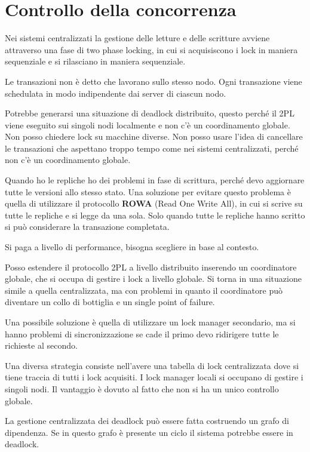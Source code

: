 \section{Controllo della concorrenza}
Nei sistemi centralizzati la gestione delle letture e delle scritture avviene
attraverso una fase di two phase locking, in cui si acquisiscono i lock in
maniera sequenziale e si rilasciano in maniera sequenziale.

Le transazioni non è detto che lavorano sullo stesso nodo. Ogni transazione 
viene schedulata in modo indipendente dai server di ciascun nodo.

Potrebbe generarsi una situazione di deadlock distribuito, questo perché il 2PL
viene eseguito sui singoli nodi localmente e non c'è un coordinamento globale.
Non posso chiedere lock su macchine diverse. Non posso usare l'idea di cancellare 
le transazioni che aspettano troppo tempo come nei sistemi centralizzati, perché
non c'è un coordinamento globale.

Quando ho le repliche ho dei problemi in fase di scrittura, perché devo aggiornare 
tutte le versioni allo stesso stato. Una soluzione per evitare questo problema
è quella di utilizzare il protocollo \textbf{ROWA} (Read One Write All), in cui
si scrive su tutte le repliche e si legge da una sola. Solo quando tutte le 
repliche hanno scritto si può considerare la transazione completata.

Si paga a livello di performance, bisogna scegliere in base al contesto.

Posso estendere il protocollo 2PL a livello distribuito inserendo un
coordinatore globale, che si occupa di gestire i lock a livello globale. 
Si torna in una situazione simile a quella centralizzata, ma con problemi in 
quanto il coordinatore può diventare un collo di bottiglia e un single point of
failure.

Una possibile soluzione è quella di utilizzare un lock manager secondario, ma 
si hanno problemi di sincronizzazione se cade il primo devo ridirigere tutte le
richieste al secondo.

Una diversa strategia consiste nell'avere una tabella di lock centralizzata dove 
si tiene traccia di tutti i lock acquisiti. I lock manager locali si occupano
di gestire i singoli nodi. Il vantaggio è dovuto al fatto che non si ha un unico
controllo globale.

La gestione centralizzata dei deadlock può essere fatta costruendo un grafo di
dipendenza. Se in questo grafo è presente un ciclo il sistema potrebbe essere in
deadlock. 

